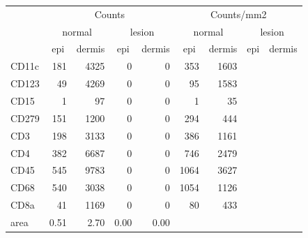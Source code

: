 \documentclass{article}
\begin{document}
\begin{tabular}{lrrrr|rrrr}
   \hline
 
         \multicolumn{1}{c}{} & \multicolumn{4}{c|}{Counts} & \multicolumn{4}{c}{Counts/mm2} \\ 
         \multicolumn{1}{c}{} & \multicolumn{2}{c}{normal} & \multicolumn{2}{c|}{lesion} & \multicolumn{2}{c}{normal} & \multicolumn{2}{c}{lesion}  \\ 
         \multicolumn{1}{c}{} & \multicolumn{1}{c}{epi} & dermis & \multicolumn{1}{c}{epi} & \multicolumn{1}{c|}{dermis} & \multicolumn{1}{c}{epi} & dermis & \multicolumn{1}{c}{epi} & dermis  \\ 
         \hline
    CD11c & 181 & 4325 & 0 & 0 & 353 & 1603 &  &  \\ 
  CD123 & 49 & 4269 & 0 & 0 & 95 & 1583 &  &  \\ 
  CD15 & 1 & 97 & 0 & 0 & 1 & 35 &  &  \\ 
  CD279 & 151 & 1200 & 0 & 0 & 294 & 444 &  &  \\ 
  CD3 & 198 & 3133 & 0 & 0 & 386 & 1161 &  &  \\ 
  CD4 & 382 & 6687 & 0 & 0 & 746 & 2479 &  &  \\ 
  CD45 & 545 & 9783 & 0 & 0 & 1064 & 3627 &  &  \\ 
  CD68 & 540 & 3038 & 0 & 0 & 1054 & 1126 &  &  \\ 
  CD8a & 41 & 1169 & 0 & 0 & 80 & 433 &  &  \\ 
  area & 0.51 & 2.70 & 0.00 & 0.00 &    &    &    &    \\ 
   \hline
\end{tabular}
\end{document}
